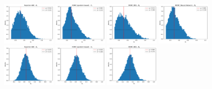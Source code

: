 \documentclass[nojss]{jss}
\begin{document}
\begin{figure}[ht]
  \begin{center}
    \includegraphics[width=0.24\textwidth]{./images/chapter4/mae2_hist_t1_rejection.pdf}
    \includegraphics[width=0.24\textwidth]{./images/chapter4/mae2_hist_t1_romc.pdf}
    \includegraphics[width=0.24\textwidth]{./images/chapter4/mae2_hist_t1_romc_bo.pdf}
    \includegraphics[width=0.24\textwidth]{./images/chapter4/mae2_hist_t1_romc_nn.pdf}\\
    \includegraphics[width=0.24\textwidth]{./images/chapter4/mae2_hist_t2_rejection.pdf}
    \includegraphics[width=0.24\textwidth]{./images/chapter4/mae2_hist_t2_romc.pdf}
    \includegraphics[width=0.24\textwidth]{./images/chapter4/mae2_hist_t2_romc_bo.pdf}

\end{center}
\end{figure}
\end{document}
